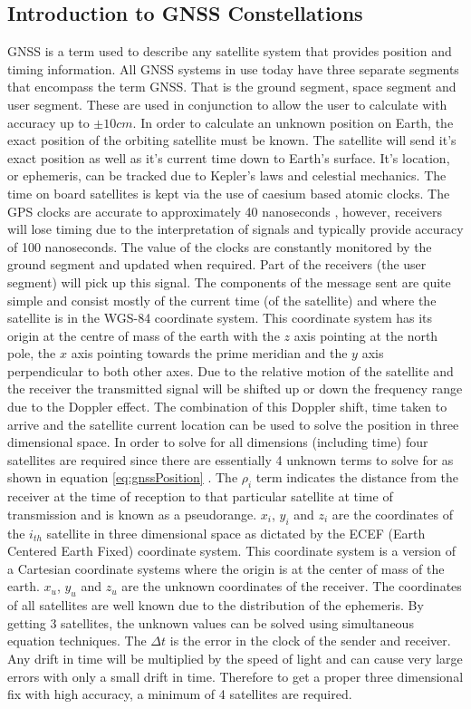 \subsection{Introduction to GNSS Constellations}\label{subsec:GNSS_Intro}
GNSS is a term used to describe any satellite system that provides position and timing information. All GNSS systems in use today have three separate segments that
encompass the term GNSS. That is the ground segment, space segment and user segment. These are used in conjunction to allow the user to calculate with accuracy up to $\pm
10cm$. In order to calculate an unknown position on Earth, the exact position of the orbiting satellite must be known. The satellite will send it's exact position as well
as it's current time down to Earth's surface. It's location, or ephemeris, can be tracked due to Kepler's laws and celestial mechanics. The time on board satellites is
kept via the use of caesium based atomic clocks. The GPS clocks are accurate to approximately 40 nanoseconds \cite{RN72} \cite{RN62}, however, receivers will lose timing due to
the interpretation of signals and typically provide accuracy of 100 nanoseconds. The value of the clocks are constantly monitored by the ground segment and updated when
required. Part of the receivers (the user segment) will pick up this signal. The components of the message sent are quite simple and consist mostly of the current time
(of the satellite) and where the satellite is in the WGS-84 coordinate system\cite{RN46}. This coordinate system has its origin at the centre of mass of the earth with
the $z$ axis pointing at the north pole, the $x$ axis pointing towards the prime meridian and the $y$ axis perpendicular to both other axes. Due to the relative motion of the
satellite and the receiver the transmitted signal will be shifted up or down the frequency range due to the Doppler effect. The combination of this Doppler shift, time
taken to arrive and the satellite current location can be used to solve the position in three dimensional space. In order to solve for all dimensions (including time)
four satellites are required since there are essentially 4 unknown terms to solve for as shown in equation \ref{eq:gnssPosition} \cite{RN46}. The $\rho_i$ term indicates
the distance from the receiver at the time of reception to that particular satellite at time of transmission  and is known as a pseudorange. $x_i$, $y_i$ and $z_i$ are
the coordinates of the $i_{th}$ satellite in three dimensional space as dictated by the ECEF (Earth Centered Earth Fixed) coordinate system. This coordinate system is a
version of a Cartesian coordinate systems where the origin is at the center of mass of the earth. $x_u$, $y_u$ and $z_u$ are the unknown coordinates of the receiver. The
coordinates of all satellites are well known due to the distribution of the ephemeris. By getting 3 satellites, the unknown values can be solved using simultaneous
equation techniques. The $\Delta t$ is the error in the clock of the sender and receiver. Any drift in time will be multiplied by the speed of light and can cause very
large errors with only a small drift in time. Therefore to get a proper three dimensional fix with high accuracy, a minimum of 4 satellites are required.  

